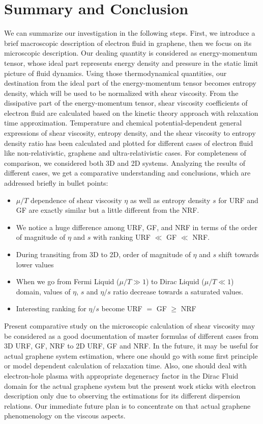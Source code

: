 \documentclass[amsmath,amssymb,aps,prb]{revtex4-2}
\begin{document}
    \section{Summary and Conclusion}
    \label{sec: Sum}
    We can summarize our investigation in the following steps.
    First, we introduce a brief macroscopic description of electron fluid in graphene, then we focus on its microscopic description. Our dealing quantity is considered as energy-momentum tensor, whose ideal part represents energy density and pressure in the static limit picture of fluid dynamics. Using those thermodynamical quantities, our destination from the ideal part of the energy-momentum tensor becomes entropy density, which will be used to be normalized with shear viscosity. From the dissipative part of the energy-momentum tensor, shear viscosity coefficients of electron fluid are calculated based on the kinetic theory approach with relaxation time approximation. Temperature and chemical potential-dependent general expressions of shear viscosity, entropy density, and the shear viscosity to entropy density ratio has been calculated and plotted for different cases of electron fluid like non-relativistic, graphene and ultra-relativistic cases. For completeness of comparison, we considered both 3D and 2D systems. Analyzing the results of different cases, we get a comparative understanding and conclusions, which are addressed briefly in bullet points:
    \begin{itemize}
    \item $\mu/T$ dependence of shear viscosity $\eta$ as well as entropy density $s$ for URF and GF are exactly similar but a little different from the NRF.
    \item We notice a huge difference among URF, GF, and NRF in terms of the order of magnitude of $\eta$ and $s$ with ranking URF $\ll$ GF $\ll$ NRF.
    \item During transiting from 3D to 2D, order of magnitude of $\eta$ and $s$ shift towards lower values
    \item When we go from Fermi Liquid ($\mu/T\gg 1$) to Dirac Liquid ($\mu/T\ll 1$) domain, values of $\eta$,
        $s$ and $\eta/s$ ratio decrease towards a saturated values.
    \item Interesting ranking for $\eta/s$ become  URF $=$ GF $\ge$ NRF
    \end{itemize}
    Present comparative study on the microscopic calculation of shear viscosity may be considered as a good documentation of master formulas of different cases from 3D URF, GF, NRF to 2D URF, GF and NRF. In the future, it may be useful for actual graphene system estimation, where one should go with some first principle or model dependent calculation of relaxation time. Also, one should deal with electron-hole plasma with appropriate degeneracy factor in the Dirac Fluid domain for the actual graphene system but the present work sticks with electron description only due to observing the estimations for its  different dispersion relations. Our immediate future plan is to concentrate on that actual graphene phenomenology on the viscous aspects. 
    
\end{document}
